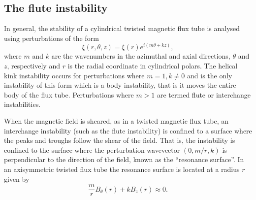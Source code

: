 \documentclass[fleqn,usenatbib]{mnras}
\begin{document}
\subsection{The flute instability}
\label{sec-flute-intro}

In general, the stability of a cylindrical twisted magnetic flux tube is analysed using perturbations of the form
\begin{equation}
  \label{eq:kink_perturbation}
\xi(r, \theta, z) = \xi(r) e^{i(m\theta + kz)},
\end{equation}
where $m$ and $k$ are the wavenumbers in the azimuthal and axial directions,
  $\theta$ and $z$, respectively and $r$ is the radial coordinate in
  cylindrical polars. 
The helical kink instability occurs for perturbations where $m=1, k\ne0$ and is the only instability of this form which is a body instability, that is it moves the entire body of the flux tube. Perturbations where $m>1$ are termed flute or interchange instabilities.

When the magnetic field is sheared, as in a twisted magnetic flux
tube, an interchange instability (such as the flute
instability) is confined to a surface where the peaks and troughs
follow the shear of the field. That is, the instability is confined to
the surface where the perturbation wavevector $(0, m/r, k)$ is
perpendicular to the direction of the field, known as the
  ``resonance surface''. In an axisymmetric twisted
flux tube the resonance surface is located at a radius $r$
given by
\begin{equation}
  \label{eq:resonant_surface}
\frac{m}{r} B_{\theta}(r) + kB_z(r) \approx 0.
\end{equation}
\end{document}
